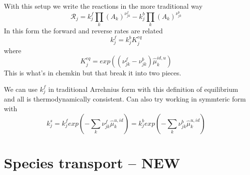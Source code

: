 \documentclass[11pt]{article}
\begin{document}
With this setup we write the reactions in the more traditional way
\begin{equation}
\mathcal{R}_j = k_j^f \prod_k (A_k)^{\nu_{jk}^f}
- k_j^b \prod_k (A_k)^{\nu_{jk}^b}
\end{equation}
In this form the forward and reverse rates are related
\begin{equation}
 k_j^f = k_j^b K_j^{eq}
\end{equation}
where
\begin{equation}
K_j^{eq} = 
exp( (\nu_{jk}^f - \nu_{jk}^b) \hat{\mu}_k^{id,u})
\label{eq:kin_equil_trad}
\end{equation}
This is what's in chemkin but that break it into two pieces.

We can use $k_j^f$ in traditional Arrehnius form with this definition of equilibrium and all is thermodynamically
consistent.  Can also try working in symmteric form with
\[
k_j^s
=  k_j^f 
exp( - \sum_k \nu_{jk}^f \hat{\mu}_k^{u,id})
=  k_j^b 
exp( -  \sum_k \nu_{jk}^b \hat{\mu}_k^{u,id})
\]

\section{Species transport -- NEW}
\end{document}
